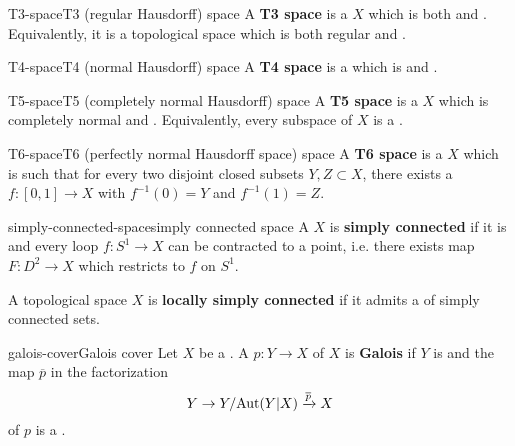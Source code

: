\begin{topic}{T3-space}{T3 (regular Hausdorff) space}
    A \textbf{T3 space} is a  $X$ which is both  and . Equivalently, it is a topological space which is both regular and .
\end{topic}

\begin{topic}{T4-space}{T4 (normal Hausdorff) space}
    A \textbf{T4 space} is a  which is  and .
\end{topic}

\begin{topic}{T5-space}{T5 (completely normal Hausdorff) space}
    A \textbf{T5 space} is a  $X$ which is completely normal and . Equivalently, every subspace of $X$ is a .
\end{topic}

\begin{topic}{T6-space}{T6 (perfectly normal Hausdorff space) space}
    A \textbf{T6 space} is a  $X$ which is  such that for every two disjoint closed subsets $Y, Z \subset X$, there exists a  $f \colon [0, 1] \to X$ with $f^{-1}(0) = Y$ and $f^{-1}(1) = Z$.
\end{topic}

\begin{topic}{simply-connected-space}{simply connected space}
    A  $X$ is \textbf{simply connected} if it is  and every loop $f \colon S^1 \to X$ can be contracted to a point, i.e. there exists map $F \colon D^2 \to X$ which restricts to $f$ on $S^1$.
    
    A topological space $X$ is \textbf{locally simply connected} if it admits a  of simply connected sets.
\end{topic}

\begin{topic}{galois-cover}{Galois cover}
    Let $X$ be a . A  $p \colon Y \to X$ of $X$ is \textbf{Galois} if $Y$ is  and the map $\overline{p}$ in the factorization
    \[ Y \to Y / \textup{Aut}(Y|X) \xrightarrow{\overline{p}} X \]
    of $p$ is a .
\end{topic}

